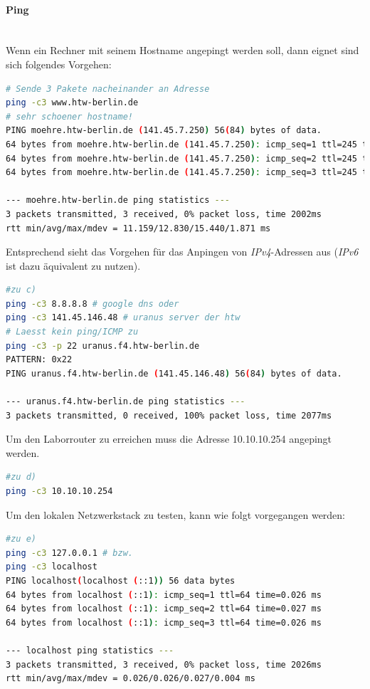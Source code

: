 \documentclass[paper=a4,fontsize=11pt]{scrartcl}%
\numberwithin{equation}{section}
\begin{document}
\paragraph{Ping}~\\
Wenn ein Rechner mit seinem Hostname angepingt werden soll, dann eignet sind sich folgendes Vorgehen:
\begin{lstlisting}[style=Bash, language=Bash]
# Sende 3 Pakete nacheinander an Adresse
ping -c3 www.htw-berlin.de
# sehr schoener hostname!
PING moehre.htw-berlin.de (141.45.7.250) 56(84) bytes of data.
64 bytes from moehre.htw-berlin.de (141.45.7.250): icmp_seq=1 ttl=245 time=15.4 ms
64 bytes from moehre.htw-berlin.de (141.45.7.250): icmp_seq=2 ttl=245 time=11.8 ms
64 bytes from moehre.htw-berlin.de (141.45.7.250): icmp_seq=3 ttl=245 time=11.1 ms

--- moehre.htw-berlin.de ping statistics ---
3 packets transmitted, 3 received, 0% packet loss, time 2002ms
rtt min/avg/max/mdev = 11.159/12.830/15.440/1.871 ms
\end{lstlisting}

Entsprechend sieht das Vorgehen für das Anpingen von \emph{IPv4}-Adressen aus (\emph{IPv6} ist dazu äquivalent zu nutzen).		
\begin{lstlisting}[style=Bash, language=Bash, label=ping_ip]
#zu c)
ping -c3 8.8.8.8 # google dns oder 
ping -c3 141.45.146.48 # uranus server der htw
# Laesst kein ping/ICMP zu
ping -c3 -p 22 uranus.f4.htw-berlin.de
PATTERN: 0x22
PING uranus.f4.htw-berlin.de (141.45.146.48) 56(84) bytes of data.

--- uranus.f4.htw-berlin.de ping statistics ---
3 packets transmitted, 0 received, 100% packet loss, time 2077ms
\end{lstlisting}
Um den Laborrouter zu erreichen muss die Adresse 10.10.10.254 angepingt werden.
\begin{lstlisting}[style=Bash, language=Bash]
#zu d)
ping -c3 10.10.10.254
\end{lstlisting}

Um den lokalen Netzwerkstack zu testen, kann wie folgt vorgegangen werden:		
\begin{lstlisting}[style=Bash, language=Bash]
#zu e)
ping -c3 127.0.0.1 # bzw.
ping -c3 localhost
PING localhost(localhost (::1)) 56 data bytes
64 bytes from localhost (::1): icmp_seq=1 ttl=64 time=0.026 ms
64 bytes from localhost (::1): icmp_seq=2 ttl=64 time=0.027 ms
64 bytes from localhost (::1): icmp_seq=3 ttl=64 time=0.026 ms

--- localhost ping statistics ---
3 packets transmitted, 3 received, 0% packet loss, time 2026ms
rtt min/avg/max/mdev = 0.026/0.026/0.027/0.004 ms
\end{lstlisting}
\end{document}
